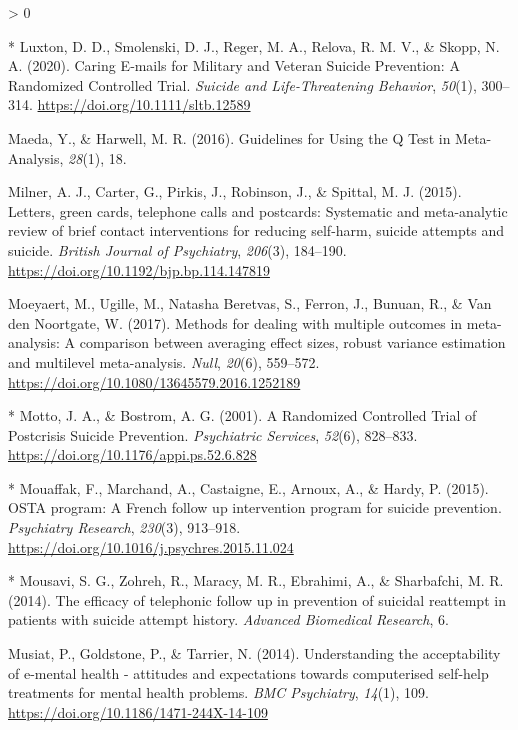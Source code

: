 \documentclass[
  english,
  man]{apa6}
\newlength{\cslhangindent}
\newenvironment{CSLReferences}[2] %
 {%
  \setlength{\parindent}{0pt}
  \ifodd #1 \everypar{\setlength{\hangindent}{\cslhangindent}}\ignorespaces\fi
  \ifnum #2 > 0
  \setlength{\parskip}{#2\baselineskip}
  \fi
 }%
 {}
\begin{document}
\begin{CSLReferences}{1}{0}
\leavevmode\hypertarget{ref-luxton2020}{}%
* Luxton, D. D., Smolenski, D. J., Reger, M. A., Relova, R. M. V., \& Skopp, N. A. (2020). Caring {E}‐mails for {Military} and {Veteran Suicide Prevention}: A {Randomized Controlled Trial}. \emph{Suicide and Life-Threatening Behavior}, \emph{50}(1), 300--314. \url{https://doi.org/10.1111/sltb.12589}

\leavevmode\hypertarget{ref-maeda2016}{}%
Maeda, Y., \& Harwell, M. R. (2016). Guidelines for {Using} the {Q Test} in {Meta}-{Analysis}, \emph{28}(1), 18.

\leavevmode\hypertarget{ref-milner2015}{}%
Milner, A. J., Carter, G., Pirkis, J., Robinson, J., \& Spittal, M. J. (2015). Letters, green cards, telephone calls and postcards: Systematic and meta-analytic review of brief contact interventions for reducing self-harm, suicide attempts and suicide. \emph{British Journal of Psychiatry}, \emph{206}(3), 184--190. \url{https://doi.org/10.1192/bjp.bp.114.147819}

\leavevmode\hypertarget{ref-moeyaert2017}{}%
Moeyaert, M., Ugille, M., Natasha Beretvas, S., Ferron, J., Bunuan, R., \& Van den Noortgate, W. (2017). Methods for dealing with multiple outcomes in meta-analysis: A comparison between averaging effect sizes, robust variance estimation and multilevel meta-analysis. \emph{Null}, \emph{20}(6), 559--572. \url{https://doi.org/10.1080/13645579.2016.1252189}

\leavevmode\hypertarget{ref-motto2001}{}%
* Motto, J. A., \& Bostrom, A. G. (2001). A {Randomized Controlled Trial} of {Postcrisis Suicide Prevention}. \emph{Psychiatric Services}, \emph{52}(6), 828--833. \url{https://doi.org/10.1176/appi.ps.52.6.828}

\leavevmode\hypertarget{ref-mouaffak2015}{}%
* Mouaffak, F., Marchand, A., Castaigne, E., Arnoux, A., \& Hardy, P. (2015). {OSTA} program: A {French} follow up intervention program for suicide prevention. \emph{Psychiatry Research}, \emph{230}(3), 913--918. \url{https://doi.org/10.1016/j.psychres.2015.11.024}

\leavevmode\hypertarget{ref-mousavi2014}{}%
* Mousavi, S. G., Zohreh, R., Maracy, M. R., Ebrahimi, A., \& Sharbafchi, M. R. (2014). The efficacy of telephonic follow up in prevention of suicidal reattempt in patients with suicide attempt history. \emph{Advanced Biomedical Research}, 6.

\leavevmode\hypertarget{ref-musiat2014}{}%
Musiat, P., Goldstone, P., \& Tarrier, N. (2014). Understanding the acceptability of e-mental health - attitudes and expectations towards computerised self-help treatments for mental health problems. \emph{BMC Psychiatry}, \emph{14}(1), 109. \url{https://doi.org/10.1186/1471-244X-14-109}


\end{CSLReferences}
\end{document}
